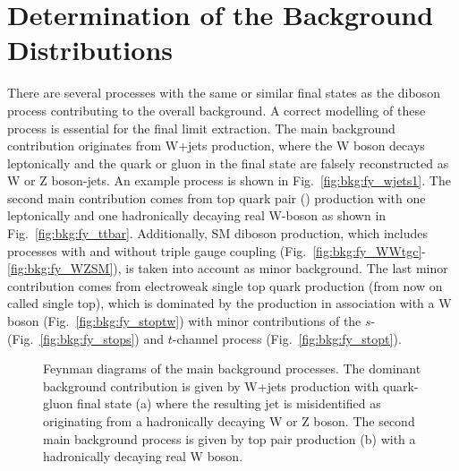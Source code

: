 \chapter{Determination of the Background Distributions}
\label{chap:bkg}

There are several processes with the same or similar final states as the diboson process contributing to the overall background. A correct modelling of these process is essential for the final limit extraction. The main background contribution originates from W+jets production, where the W boson decays leptonically and the quark or gluon in the final state are falsely reconstructed as W or Z boson-jets. An example process is shown in Fig.~\ref{fig:bkg:fy_wjets1}.
The second main contribution comes from top quark pair (\ttbar) production with one leptonically and one hadronically decaying real W-boson as shown in Fig.~\ref{fig:bkg:fy_ttbar}. Additionally, SM diboson production, which includes processes with and without triple gauge coupling (Fig.~\ref{fig:bkg:fy_WWtgc}-\ref{fig:bkg:fy_WZSM}), is taken into account as minor background. The last minor contribution comes from electroweak single top quark production (from now on called single top), which is dominated by the production in association with a W boson (Fig.~\ref{fig:bkg:fy_stoptw}) with minor contributions of the $s$- (Fig.~\ref{fig:bkg:fy_stops}) and $t$-channel process (Fig.~\ref{fig:bkg:fy_stopt}). \\
\begin{figure}[h!]
	\centering
	\caption[Feynman diagrams of the main background processes]{Feynman diagrams of the main background processes. The dominant background contribution is given by W+jets production with quark-gluon final state (a) where the resulting jet is misidentified as originating from a hadronically decaying W  or Z boson. The second main background process is given by top pair production (b) with a hadronically decaying real W boson.}
\end{figure}
\newpage

